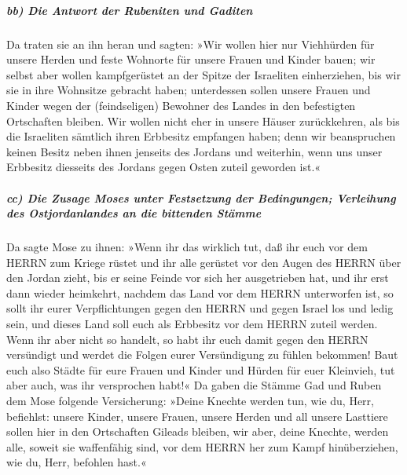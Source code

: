 \hypertarget{bb-die-antwort-der-rubeniten-und-gaditen}{%
\subparagraph{bb) Die Antwort der Rubeniten und
Gaditen}\label{bb-die-antwort-der-rubeniten-und-gaditen}}

Da traten sie an ihn heran und sagten: »Wir wollen hier
nur Viehhürden für unsere Herden und feste Wohnorte für unsere Frauen
und Kinder bauen; wir selbst aber wollen kampfgerüstet an
der Spitze der Israeliten einherziehen, bis wir sie in ihre Wohnsitze
gebracht haben; unterdessen sollen unsere Frauen und Kinder wegen der
(feindseligen) Bewohner des Landes in den befestigten Ortschaften
bleiben. Wir wollen nicht eher in unsere Häuser
zurückkehren, als bis die Israeliten sämtlich ihren Erbbesitz empfangen
haben; denn wir beanspruchen keinen Besitz neben ihnen
jenseits des Jordans und weiterhin, wenn uns unser Erbbesitz diesseits
des Jordans gegen Osten zuteil geworden ist.«

\hypertarget{cc-die-zusage-moses-unter-festsetzung-der-bedingungen-verleihung-des-ostjordanlandes-an-die-bittenden-stuxe4mme}{%
\subparagraph{cc) Die Zusage Moses unter Festsetzung der Bedingungen;
Verleihung des Ostjordanlandes an die bittenden
Stämme}\label{cc-die-zusage-moses-unter-festsetzung-der-bedingungen-verleihung-des-ostjordanlandes-an-die-bittenden-stuxe4mme}}

Da sagte Mose zu ihnen: »Wenn ihr das wirklich tut, daß
ihr euch vor dem HERRN zum Kriege rüstet und ihr alle
gerüstet vor den Augen des HERRN über den Jordan zieht, bis er seine
Feinde vor sich her ausgetrieben hat, und ihr erst dann
wieder heimkehrt, nachdem das Land vor dem HERRN unterworfen ist, so
sollt ihr eurer Verpflichtungen gegen den HERRN und gegen Israel los und
ledig sein, und dieses Land soll euch als Erbbesitz vor dem HERRN zuteil
werden. Wenn ihr aber nicht so handelt, so habt ihr euch
damit gegen den HERRN versündigt und werdet die Folgen eurer
Versündigung zu fühlen bekommen! Baut euch also Städte
für eure Frauen und Kinder und Hürden für euer Kleinvieh, tut aber auch,
was ihr versprochen habt!« Da gaben die Stämme Gad und
Ruben dem Mose folgende Versicherung: »Deine Knechte werden tun, wie du,
Herr, befiehlst: unsere Kinder, unsere Frauen, unsere
Herden und all unsere Lasttiere sollen hier in den Ortschaften Gileads
bleiben, wir aber, deine Knechte, werden alle, soweit sie
waffenfähig sind, vor dem HERRN her zum Kampf hinüberziehen, wie du,
Herr, befohlen hast.«

